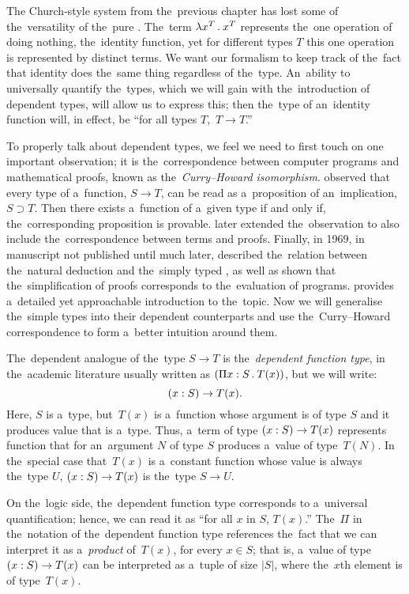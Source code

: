 
The Church-style system from the~previous chapter has lost some of
the~versatility of the~pure \lc. The~term $\lambda x^T \, . \: x^T$ represents
the~one operation of doing nothing, the~identity function, yet for different
types $T$ this one operation is represented by distinct terms. We want our
formalism to keep track of the~fact that identity does the~same thing regardless
of the~type. An~ability to universally quantify the~types, which we will gain
with the~introduction of dependent types, will allow us to express this; then
the~type of an~identity function will, in effect, be ``for all types $T$,\,
$T \to T$.''

To properly talk about dependent types, we feel we need to first touch on one
important observation; it is the~correspondence between computer programs and
mathematical proofs, known as the~\emph{Curry–Howard isomorphism}.
\citet{curry_1934} observed that every type of a~function, $S \to T$,
can be read as a~proposition of an~implication, $S \supset T$. Then there exists
a~function of a~given type if and only if, the~corresponding proposition is
provable. \citet{curry_1958} later extended the~observation to also include
the~correspondence between terms and proofs. Finally, in 1969, in manuscript not
published until much later, \citet{howard_1980} described the~relation between
the~natural deduction and the~simply typed \lc, as well as shown that
the~simplification of proofs corresponds to the~evaluation of programs.
\citet{wadler_2015} provides a~detailed yet approachable introduction to
the~topic. Now we will generalise the~simple types into their dependent
counterparts and use the~Curry–Howard correspondence to form a~better intuition
around them.

The~dependent analogue of the~type $S \to T$ is the~\emph{dependent
function type}, in the~academic literature usually written as ${(\Pi x \overset{}:
S \, . \: T(x))}$, but we will write:
\[
  (x : S) \to T(x).
\]
Here, $S$ is a~type, but \,$T(x)$ is a~function whose argument is of type $S$
and it produces value that is a~type. Thus, a~term of type $(x : S) \to T(x)$
represents function that for an~argument $N$ of type $S$ produces a~value of
type \,$T(N)$. In the~special case that \,$T(x)$ is a~constant function whose
value is always the~type $U$, $(x : S) \to T(x)$ is the~type $S \to U$.

On the~logic side, the~dependent function type corresponds to a~universal
quantification; hence, we can read it as ``for all $x$ in $S$, $T(x)$.''
The~$\Pi$ in the~notation of the~dependent function type references the~fact
that we can interpret it as a~\emph{product} of \,$T(x)$, for every $x \in S$;
that is, a~value of type $(x : S) \to T(x)$ can be interpreted as a~tuple of size
$|S|$, where the~$x$th element is of type \,$T(x)$.

